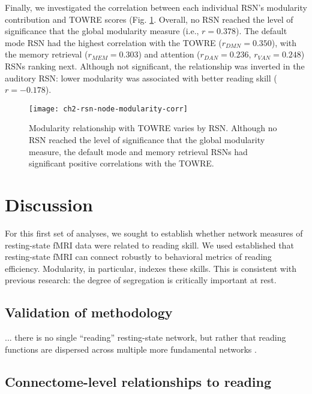 Finally, we investigated the correlation between each individual RSN's modularity contribution and TOWRE scores (Fig. \ref{fig:ch2-rsn-node-modularity-corr}. Overall, no RSN reached the level of significance that the global modularity measure (i.e., $r = 0.378$). The default mode RSN had the highest correlation with the TOWRE ($r_{DMN} = 0.350$), with the memory retrieval ($r_{MEM} = 0.303$) and attention ($r_{DAN} = 0.236$, $r_{VAN} = 0.248$) RSNs ranking next. Although not significant, the relationship was inverted in the auditory RSN: lower modularity was associated with better reading skill ($r = -0.178$).

\begin{figure}[t]
    \centering
    \texttt{[image: ch2-rsn-node-modularity-corr]}
    \caption[Modularity relationship with TOWRE varies by RSN.] {Modularity relationship with TOWRE varies by RSN. Although no RSN reached the level of significance that the global modularity measure, the default mode and memory retrieval RSNs had significant positive correlations with the TOWRE.}
    \label{fig:ch2-rsn-node-modularity-corr}
\end{figure}

\section{Discussion}

For this first set of analyses, we sought to establish whether network measures of resting-state fMRI data were related to reading skill. We used established  that resting-state fMRI can connect robustly to behavioral metrics of reading efficiency. Modularity, in particular, indexes these skills. This is consistent with previous research: the degree of segregation is critically important at rest. 

\subsection{Validation of methodology}

... there is no single ``reading'' resting-state network, but rather that reading functions are dispersed across multiple more fundamental networks \citep{Vogel2013}. 


\subsection{Connectome-level relationships to reading}

